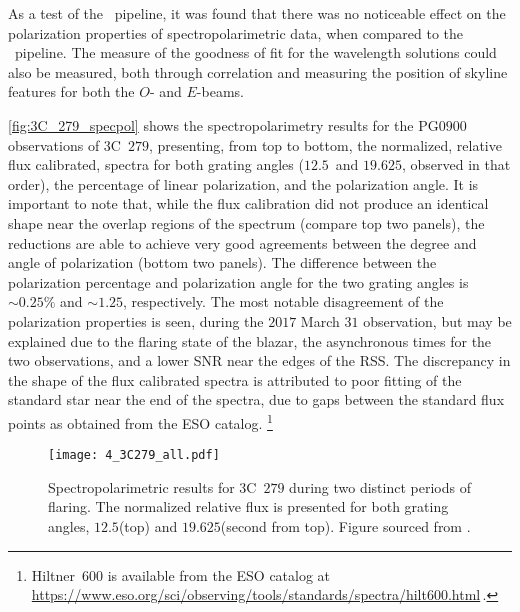 As a test of the \stops\ pipeline, it was found that there was no noticeable effect on the polarization properties of spectropolarimetric data, when compared to the \polsalt\ pipeline.
The measure of the goodness of fit for the wavelength solutions could also be measured, both through correlation and measuring the position of skyline features for both the $O$- and $E$-beams.

\pagebreak
{}

\autoref{fig:3C_279_specpol} shows the spectropolarimetry results for the PG$0900$ observations of 3C~$279$, presenting, from top to bottom, the normalized, relative flux calibrated, spectra for both grating angles ($12.5$\degree\ and $19.625$\degree, observed in that order), the percentage of linear polarization, and the polarization angle.
It is important to note that, while the flux calibration did not produce an identical shape near the overlap regions of the spectrum (compare top two panels), the reductions are able to achieve very good agreements between the degree and angle of polarization (bottom two panels).
The difference between the polarization percentage and polarization angle for the two grating angles is $\sim 0.25\%$ and $\sim 1.25$\degree, respectively.
The most notable disagreement of the polarization properties is seen, during the $2017$ March $31$ observation, but may be explained due to the flaring state of the blazar, the asynchronous times for the two observations, and a lower \gls{SNR} near the edges of the \gls{RSS}.
The discrepancy in the shape of the flux calibrated spectra is attributed to poor fitting of the standard star near the end of the spectra, due to gaps between the standard flux points as obtained from the \gls{ESO} catalog.%
\footnote{Hiltner~$600$ is available from the \gls{ESO} catalog at \url{https://www.eso.org/sci/observing/tools/standards/spectra/hilt600.html}\,.}

\begin{figure}[tp]
    \centering
    \texttt{[image: 4\_3C279\_all.pdf]}
    \caption{
        Spectropolarimetric results for 3C~$279$ during two distinct periods of flaring.
        The normalized relative flux is presented for both grating angles, $12.5$\degree (top) and $19.625$\degree (second from top).
        Figure sourced from \citep{Cooper_HEASA2022}.
    }
    \label{fig:3C_279_specpol}
\end{figure}


